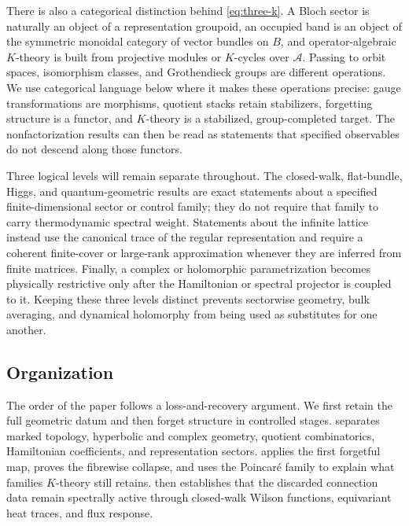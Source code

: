 \documentclass[11pt]{article}
\theoremstyle{definition}
\theoremstyle{remark}
\begin{document}
There is also a categorical distinction behind \eqref{eq:three-k}.  A Bloch
sector is naturally an object of a representation groupoid, an occupied band
is an object of the symmetric monoidal category of vector bundles on \(B\),
and operator-algebraic \(K\)-theory is built from projective modules or
\(K\)-cycles over \(\mathcal A\).  Passing to orbit spaces, isomorphism
classes, and Grothendieck groups are different operations.  We use categorical
language below where it makes these operations precise: gauge transformations
are morphisms, quotient stacks retain stabilizers, forgetting structure is a
functor, and \(K\)-theory is a stabilized, group-completed target.  The
nonfactorization results can then be read as statements that specified
observables do not descend along those functors.

Three logical levels will remain separate throughout.  The closed-walk,
flat-bundle, Higgs, and quantum-geometric results are exact statements about
a specified finite-dimensional sector or control family; they do not require
that family to carry thermodynamic spectral weight.  Statements about the
infinite lattice instead use the canonical trace of the regular
representation and require a coherent finite-cover or large-rank
approximation whenever they are inferred from finite matrices.  Finally, a
complex or holomorphic parametrization becomes physically restrictive only
after the Hamiltonian or spectral projector is coupled to it.  Keeping these
three levels distinct prevents sectorwise geometry, bulk averaging, and
dynamical holomorphy from being used as substitutes for one another.

\subsection{Organization}

The order of the paper follows a loss-and-recovery argument.  We first retain
the full geometric datum and then forget structure in controlled stages.
 separates marked topology, hyperbolic and complex
geometry, quotient combinatorics, Hamiltonian coefficients, and
representation sectors.   applies the first forgetful
map, proves the fibrewise collapse, and uses the Poincar\'e family to explain
what families \(K\)-theory still retains.   then establishes
that the discarded connection data remain spectrally active through
closed-walk Wilson functions, equivariant heat traces, and flux response.
\end{document}
